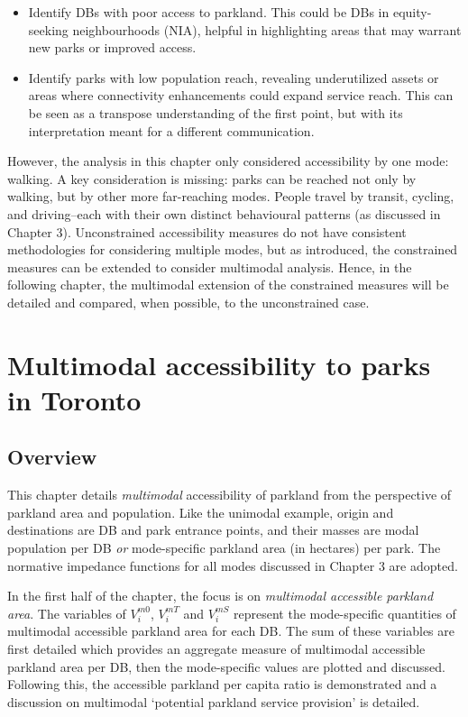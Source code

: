 \documentclass[
11pt, %
oneside, %
english, %
singlespacing, %
]{macthesis} %
\def\tightlist{}
\begin{document}
\begin{itemize}
\tightlist
\item
  Identify DBs with poor access to parkland. This could be DBs in equity-seeking neighbourhoods (NIA), helpful in highlighting areas that may warrant new parks or improved access.
\item
  Identify parks with low population reach, revealing underutilized assets or areas where connectivity enhancements could expand service reach. This can be seen as a transpose understanding of the first point, but with its interpretation meant for a different communication.
\end{itemize}

However, the analysis in this chapter only considered accessibility by one mode: walking. A key consideration is missing: parks can be reached not only by walking, but by other more far-reaching modes. People travel by transit, cycling, and driving--each with their own distinct behavioural patterns (as discussed in Chapter 3). Unconstrained accessibility measures do not have consistent methodologies for considering multiple modes, but as introduced, the constrained measures can be extended to consider multimodal analysis. Hence, in the following chapter, the multimodal extension of the constrained measures will be detailed and compared, when possible, to the unconstrained case.

\chapter{Multimodal accessibility to parks in Toronto}\label{multimodal-accessibility-to-parks-in-toronto}

\section{Overview}\label{overview-4}

This chapter details \emph{multimodal} accessibility of parkland from the perspective of parkland area and population. Like the unimodal example, origin and destinations are DB and park entrance points, and their masses are modal population per DB \emph{or} mode-specific parkland area (in hectares) per park. The normative impedance functions for all modes discussed in Chapter 3 are adopted.

In the first half of the chapter, the focus is on \emph{multimodal accessible parkland area}. The variables of \(V^{m0}_i\), \(V^{mT}_i\) and \(V^{mS}_i\) represent the mode-specific quantities of multimodal accessible parkland area for each DB. The sum of these variables are first detailed which provides an aggregate measure of multimodal accessible parkland area per DB, then the mode-specific values are plotted and discussed. Following this, the accessible parkland per capita ratio is demonstrated and a discussion on multimodal `potential parkland service provision' is detailed.
\end{document}
